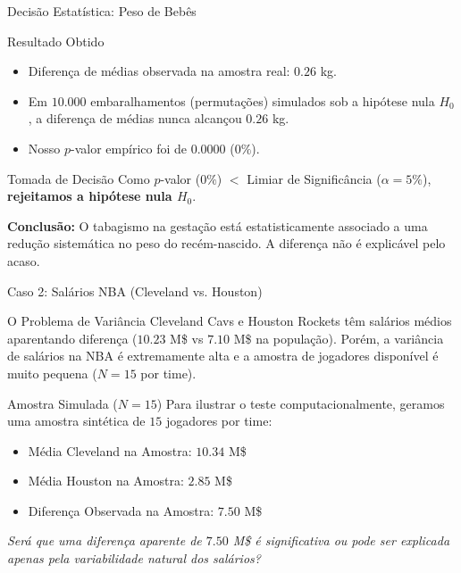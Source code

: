 \begin{frame}{Decisão Estatística: Peso de Bebês}
    \begin{block}{Resultado Obtido}
        \begin{itemize}
            \item Diferença de médias observada na amostra real: $0.26$ kg.
            \item Em $10.000$ embaralhamentos (permutações) simulados sob a hipótese nula $H_0$, a diferença de médias nunca alcançou $0.26$ kg.
            \item Nosso $p$-valor empírico foi de $0.0000$ ($0\%$).
        \end{itemize}
    \end{block}
    \begin{alertblock}{Tomada de Decisão}
        Como $p$-valor ($0\%$) $<$ Limiar de Significância ($\alpha = 5\%$), \textbf{rejeitamos a hipótese nula $H_0$}.
    \end{alertblock}
    \centering
    \textbf{Conclusão:} O tabagismo na gestação está estatisticamente associado a uma redução sistemática no peso do recém-nascido. A diferença não é explicável pelo acaso.
\end{frame}

\begin{frame}{Caso 2: Salários NBA (Cleveland vs. Houston)}
    \begin{block}{O Problema de Variância}
        Cleveland Cavs e Houston Rockets têm salários médios aparentando diferença ($10.23$ M\$ vs $7.10$ M\$ na população). Porém, a variância de salários na NBA é extremamente alta e a amostra de jogadores disponível é muito pequena ($N = 15$ por time).
    \end{block}
    \begin{block}{Amostra Simulada ($N=15$)}
        Para ilustrar o teste computacionalmente, geramos uma amostra sintética de $15$ jogadores por time:
        \begin{itemize}
            \item Média Cleveland na Amostra: $10.34$ M\$
            \item Média Houston na Amostra: $2.85$ M\$
            \item Diferença Observada na Amostra: $7.50$ M\$
        \end{itemize}
    \end{block}
    \centering
    \textit{Será que uma diferença aparente de $7.50$ M\$ é significativa ou pode ser explicada apenas pela variabilidade natural dos salários?}
\end{frame}

